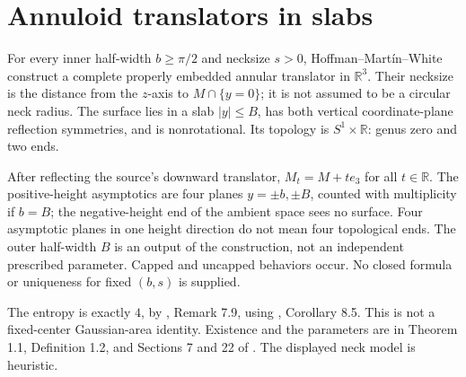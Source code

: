 \chapter{Annuloid translators in slabs}\label{sec:catalogue-translating-annuloids}
\begin{example}\label{ex:catalogue-translating-annuloids}
For every inner half-width $b\geq\pi/2$ and necksize $s>0$, Hoffman--Mart\'in--White construct a complete properly embedded annular translator in $\mathbb R^3$. Their necksize is the distance from the $z$-axis to $M\cap\{y=0\}$; it is not assumed to be a circular neck radius. The surface lies in a slab $|y|\leq B$, has both vertical coordinate-plane reflection symmetries, and is nonrotational. Its topology is $S^1\times\mathbb R$: genus zero and two ends.

After reflecting the source's downward translator, $M_t=M+te_3$ for all $t\in\mathbb R$. The positive-height asymptotics are four planes $y=\pm b,\pm B$, counted with multiplicity if $b=B$; the negative-height end of the ambient space sees no surface. Four asymptotic planes in one height direction do not mean four topological ends. The outer half-width $B$ is an output of the construction, not an independent prescribed parameter. Capped and uncapped behaviors occur. No closed formula or uniqueness for fixed $(b,s)$ is supplied.

The entropy is exactly $4$, by \cite{CatHMWAnnuli24}, Remark 7.9, using \cite{CatGMM25}, Corollary 8.5. This is not a fixed-center Gaussian-area identity. Existence and the parameters are in Theorem 1.1, Definition 1.2, and Sections 7 and 22 of \cite{CatHMWAnnuli24}. The displayed neck model is heuristic.
\end{example}

